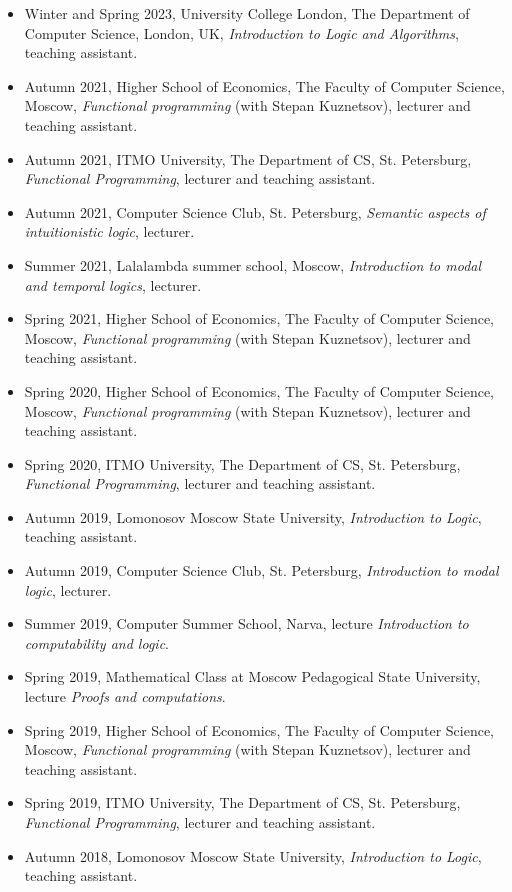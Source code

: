 \documentclass[11pt,a4paper]{article}
\begin{document}
\begin{itemize}[leftmargin=*]
    \item Winter and Spring 2023, University College London, The Department of Computer Science, London, UK, \textit{Introduction to Logic and Algorithms}, teaching assistant.
    \item Autumn 2021, Higher School of Economics, The Faculty of Computer Science, Moscow, \textit{Functional programming} (with Stepan Kuznetsov), lecturer and teaching assistant.
    \item Autumn 2021, ITMO University, The Department of CS, St. Petersburg, \textit{Functional Programming}, lecturer and teaching assistant.
    \item Autumn 2021, Computer Science Club, St. Petersburg, \textit{Semantic aspects of intuitionistic logic}, lecturer.
    \item Summer 2021, Lalalambda summer school, Moscow, \textit{Introduction to modal and temporal logics}, lecturer.
    \item Spring 2021, Higher School of Economics, The Faculty of Computer Science, Moscow, \textit{Functional programming} (with Stepan Kuznetsov), lecturer and teaching assistant.
    \item Spring 2020, Higher School of Economics, The Faculty of Computer Science, Moscow, \textit{Functional programming} (with Stepan Kuznetsov), lecturer and teaching assistant.
    \item Spring 2020, ITMO University, The Department of CS, St. Petersburg, \textit{Functional Programming}, lecturer and teaching assistant.
    \item Autumn 2019, Lomonosov Moscow State University, \textit{Introduction to Logic}, teaching assistant.
    \item Autumn 2019, Computer Science Club, St. Petersburg, \textit{Introduction to modal logic}, lecturer.
    \item Summer 2019, Computer Summer School, Narva, lecture \textit{Introduction to computability and logic}.
    \item Spring 2019, Mathematical Class at Moscow Pedagogical State University, lecture \textit{Proofs and computations}.
    \item Spring 2019, Higher School of Economics, The Faculty of Computer Science, Moscow, \textit{Functional programming} (with Stepan Kuznetsov), lecturer and teaching assistant.
    \item Spring 2019, ITMO University, The Department of CS, St. Petersburg, \textit{Functional Programming}, lecturer and teaching assistant.
    \item Autumn 2018, Lomonosov Moscow State University, \textit{Introduction to Logic}, teaching assistant.
\end{itemize}
\end{document}
